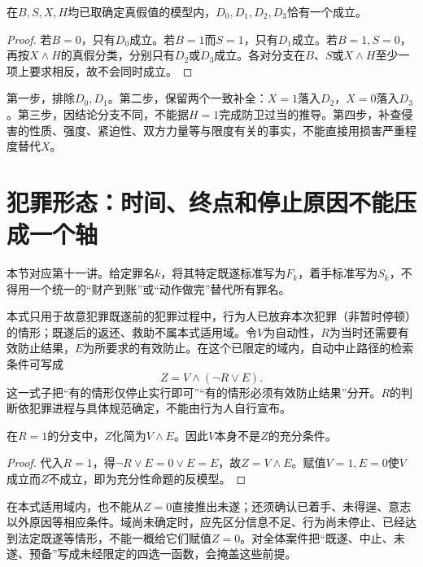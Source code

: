 \begin{modelprop}[防卫检索分支的互斥与穷尽]
在$B,S,X,H$均已取确定真假值的模型内，$D_0,D_1,D_2,D_3$恰有一个成立。
\end{modelprop}
\begin{proof}
若$B=0$，只有$D_0$成立。若$B=1$而$S=1$，只有$D_1$成立。若$B=1,S=0$，再按$X\wedge H$的真假分类，分别只有$D_2$或$D_3$成立。各对分支在$B$、$S$或$X\wedge H$至少一项上要求相反，故不会同时成立。
\end{proof}

第一步，排除$D_0,D_1$。第二步，保留两个一致补全：$X=1$落入$D_2$，$X=0$落入$D_3$。第三步，因结论分支不同，不能据$H=1$完成防卫过当的推导。第四步，补查侵害的性质、强度、紧迫性、双方力量等与限度有关的事实，不能直接用损害严重程度替代$X$。


\section{犯罪形态：时间、终点和停止原因不能压成一个轴}
本节对应第十一讲。给定罪名$k$，将其特定既遂标准写为$F_k$，着手标准写为$S_k$，不得用一个统一的“财产到账”或“动作做完”替代所有罪名。

本式只用于故意犯罪既遂前的犯罪过程中，行为人已放弃本次犯罪（非暂时停顿）的情形；既遂后的返还、救助不属本式适用域。令$V$为自动性，$R$为当时还需要有效防止结果，$E$为所要求的有效防止。在这个已限定的域内，自动中止路径的检索条件可写成
\[
 Z=V\wedge(\neg R\vee E).
\]
这一式子把“有的情形仅停止实行即可”“有的情形必须有效防止结果”分开。$R$的判断依犯罪进程与具体规范确定，不能由行为人自行宣布。

\begin{modelprop}
在$R=1$的分支中，$Z$化简为$V\wedge E$。因此$V$本身不是$Z$的充分条件。
\end{modelprop}
\begin{proof}
代入$R=1$，得$\neg R\vee E=0\vee E=E$，故$Z=V\wedge E$。赋值$V=1,E=0$使$V$成立而$Z$不成立，即为充分性命题的反模型。
\end{proof}

在本式适用域内，也不能从$Z=0$直接推出未遂；还须确认已着手、未得逞、意志以外原因等相应条件。域尚未确定时，应先区分信息不足、行为尚未停止、已经达到法定既遂等情形，不能一概给它们赋值$Z=0$。对全体案件把“既遂、中止、未遂、预备”写成未经限定的四选一函数，会掩盖这些前提。


